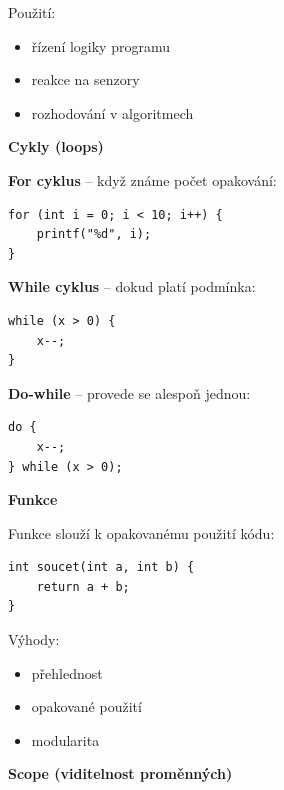\documentclass[a4paper,10pt]{article}
\begin{document}
\begin{vysvetlenibox}
 Použití:
\begin{itemize}
\item řízení logiky programu
\item reakce na senzory
\item rozhodování v algoritmech
\end{itemize}

\textbf{Cykly (loops)}

\textbf{For cyklus} – když známe počet opakování:

\begin{vzorcebox}
\begin{verbatim}
for (int i = 0; i < 10; i++) {
    printf("%d", i);
}
\end{verbatim}
\end{vzorcebox}

\textbf{While cyklus} – dokud platí podmínka:

\begin{vzorcebox}
\begin{verbatim}
while (x > 0) {
    x--;
}
\end{verbatim}
\end{vzorcebox}

\textbf{Do-while} – provede se alespoň jednou:

\begin{vzorcebox}
\begin{verbatim}
do {
    x--;
} while (x > 0);
\end{verbatim}
\end{vzorcebox}

\textbf{Funkce}

Funkce slouží k opakovanému použití kódu:

\begin{vzorcebox}
\begin{verbatim}
int soucet(int a, int b) {
    return a + b;
}
\end{verbatim}
\end{vzorcebox}

 Výhody:
\begin{itemize}
\item přehlednost
\item opakované použití
\item modularita
\end{itemize}

\textbf{Scope (viditelnost proměnných)}


\end{vysvetlenibox}
\end{document}
